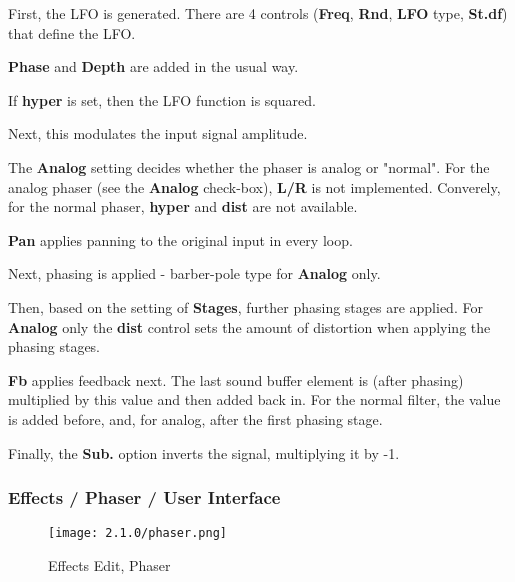    \begin{enumber}
      \item First, the LFO is generated.
         There are 4 controls
         (\textbf{Freq}, \textbf{Rnd}, \textbf{LFO} type, \textbf{St.df})
         that define the LFO.
      \item \textbf{Phase} and \textbf{Depth} are added in the usual way.
      \item If \textbf{hyper} is set, then the LFO function is squared.
      \item Next, this modulates the input signal amplitude.
      \item The \textbf{Analog} setting decides whether the phaser is analog
            or "normal".
            For the analog phaser (see the \textbf{Analog} check-box),
            \textbf{L/R} is not implemented.
            Converely, for the normal phaser, \textbf{hyper} and \textbf{dist}
            are not available.
      \item \textbf{Pan} applies panning to the original input in every loop.
      \item Next, phasing is applied - barber-pole type for \textbf{Analog} only.
      \item Then, based on the setting of \textbf{Stages}, further phasing
            stages are applied.
            For \textbf{Analog} only the \textbf{dist} control sets the amount of
            distortion when applying the phasing stages.
      \item \textbf{Fb} applies feedback next. The last sound buffer element is (after
            phasing) multiplied by this value and then added back in. For the
            normal filter, the value is added before, and, for analog, after the
            first phasing stage.
      \item Finally, the \textbf{Sub.} option inverts the signal, multiplying it
            by -1.
   \end{enumber}

\subsubsection{Effects / Phaser / User Interface}
\label{subsubsec:effects_edit_phaser_ui}

\begin{figure}[H]
   \centering
   \texttt{[image: 2.1.0/phaser.png]}
   \caption{Effects Edit, Phaser}
   \label{fig:effects_edit_phaser}
\end{figure}

